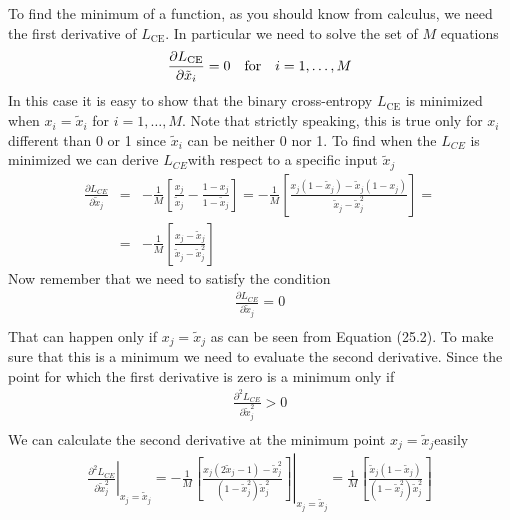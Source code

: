 \documentclass[12pt,a4]{article}
\begin{document}
To find the minimum of a function, as you should know from calculus, we need the first derivative of \( L_{\textrm{CE}}\). In particular we need to solve the set of \( M\) equations
\begin{equation}
\frac{\partial L_{\textrm{CE}}}{\partial\tilde{x}_{i}} = 0   \ \ \ \text{for}\ \ \       i = 1,\ldots ,M \\ 
\end{equation}
In this case it is easy to show that the binary cross-entropy \( L_{\textrm{CE}}\) is minimized when \( x_{i} =\tilde{x}_{i}\) for \( i = 1,\ldots ,M\). Note that strictly speaking, this is true only for \( x_{i}\)different than 0 or 1 since \(\tilde{x}_{i}\) can be neither 0 nor 1.
To find when the \( L_{CE}\) is minimized we can derive \( L_{CE}\)with respect to a specific input \(\tilde{x}_{j}\)
\begin{equation}
\begin{array}{lll}
\displaystyle \frac{\partial L_{CE}}{\partial\tilde{x}_{j}} &=& -\displaystyle\frac{1}{M}\left[\frac{x_{j}}{\tilde{x}_{j}}-\frac{1-x_{j}}{1-\tilde{x}_{j}}\right] = -\frac{1}{M}\left[\frac{x_{j}\left(1-\tilde{x}_{j}\right)-\tilde{x}_{j}\left(1-x_{j}\right)}{\tilde{x}_{j}-\tilde{x}_{j}^{2}}\right] =\\ [12px]
&= &-\displaystyle\frac{1}{M}\left[\frac{x_{j}-\tilde{x}_{j}}{\tilde{x}_{j}-\tilde{x}_{j}^{2}}\right]
\end{array}
\end{equation}
Now remember that we need to satisfy the condition 
\begin{equation}
\begin{split}
\frac{\partial L_{CE}}{\partial\tilde{x}_{j}} = 0 \\ 
\end{split}
\end{equation}
That can happen only if \( x_{j} =\tilde{x}_{j}\) as can be seen from Equation (25.2). To make sure that this is a minimum we need to evaluate the second derivative. Since the point for which the first derivative is zero is a minimum only if 
\begin{equation}
\begin{split}
\frac{\partial^{2}L_{CE}}{\partial\tilde{x}_{j}^{2}}>0 \\ 
\end{split}
\end{equation}
We can calculate the second derivative at the minimum point \( x_{j} =\tilde{x}_{j}\)easily 
\begin{equation}
\begin{split}
\left.\frac{\partial^{2}L_{CE}}{\partial\tilde{x}_{j}^{2}}\right\vert_{x_{j} =\tilde{x}_{j}} = -\left.\frac{1}{M}\left[\frac{x_{j}\left(2\tilde{x}_{j}-1\right)-\tilde{x}_{j}^{2}}{\left(1-\tilde{x}_{j}^{2}\right)\tilde{x}_{j}^{2}}\right]\right\vert_{x_{j} =\tilde{x}_{j}} =\frac{1}{M}\left[\frac{\tilde{x}_{j}\left(1-\tilde{x}_{j}\right)}{\left(1-\tilde{x}_{j}^{2}\right)\tilde{x}_{j}^{2}}\right] \\ 
\end{split}
\end{equation}
\end{document}
